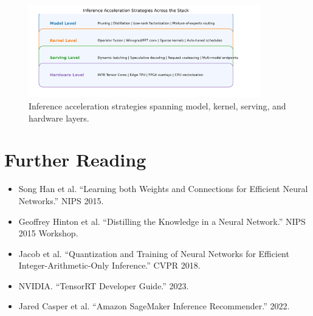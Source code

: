 \documentclass{article}
\begin{document}
\begin{figure}[H]
  \centering
  \includegraphics[width=0.9\textwidth]{accelerated_inference_strategies.png}
  \caption{Inference acceleration strategies spanning model, kernel, serving, and hardware layers.}
  \label{fig:accelerated_inference_strategies}
\end{figure}
\FloatBarrier

\section*{Further Reading}
\begin{itemize}
  \item Song Han et al. ``Learning both Weights and Connections for Efficient Neural Networks.'' NIPS 2015.
  \item Geoffrey Hinton et al. ``Distilling the Knowledge in a Neural Network.'' NIPS 2015 Workshop.
  \item Jacob et al. ``Quantization and Training of Neural Networks for Efficient Integer-Arithmetic-Only Inference.'' CVPR 2018.
  \item NVIDIA. ``TensorRT Developer Guide.'' 2023.
  \item Jared Casper et al. ``Amazon SageMaker Inference Recommender.'' 2022.
\end{itemize}
\end{document}
